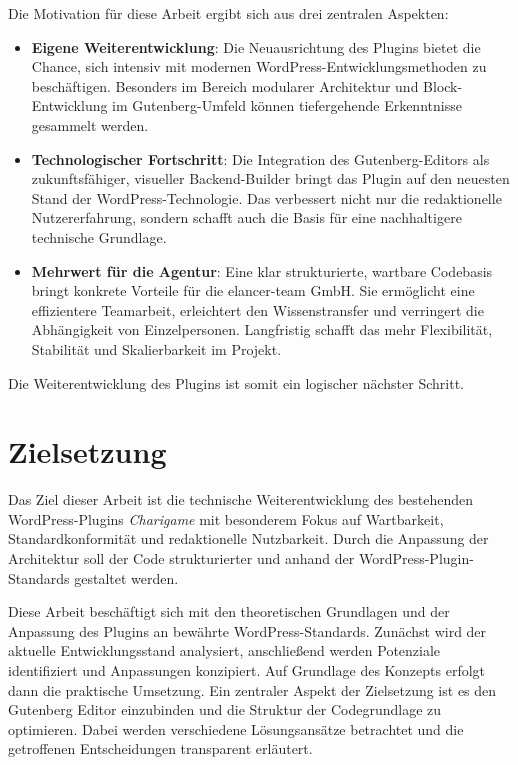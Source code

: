 Die Motivation für diese Arbeit ergibt sich aus drei zentralen Aspekten:
\begin{itemize}
    \item \textbf{Eigene Weiterentwicklung}: Die Neuausrichtung des Plugins bietet die Chance, sich intensiv mit modernen WordPress-Entwicklungsmethoden zu beschäftigen.
    Besonders im Bereich modularer Architektur und Block-Entwicklung im Gutenberg-Umfeld können tiefergehende Erkenntnisse gesammelt werden.

    \item \textbf{Technologischer Fortschritt}: Die Integration des Gutenberg-Editors als zukunftsfähiger, visueller Backend-Builder bringt das Plugin auf den neuesten Stand der WordPress-Technologie. Das verbessert nicht nur die redaktionelle Nutzererfahrung, sondern schafft auch die Basis für eine nachhaltigere technische Grundlage.

    \item \textbf{Mehrwert für die Agentur}: Eine klar strukturierte, wartbare Codebasis bringt konkrete Vorteile für die elancer-team GmbH. Sie ermöglicht eine effizientere Teamarbeit, erleichtert den Wissenstransfer und verringert die Abhängigkeit von Einzelpersonen. Langfristig schafft das mehr Flexibilität, Stabilität und Skalierbarkeit im Projekt.
\end{itemize}
Die Weiterentwicklung des Plugins ist somit ein logischer nächster Schritt.


\section{Zielsetzung}

Das Ziel dieser Arbeit ist die technische Weiterentwicklung des bestehenden WordPress-Plugins \textit{Charigame} mit besonderem Fokus auf Wartbarkeit, Standardkonformität und redaktionelle Nutzbarkeit.
Durch die Anpassung der Architektur soll der Code strukturierter und anhand der WordPress-Plugin-Standards gestaltet werden.

Diese Arbeit beschäftigt sich mit den theoretischen Grundlagen und der Anpassung des Plugins an bewährte WordPress-Standards.
Zunächst wird der aktuelle Entwicklungsstand analysiert, anschließend werden Potenziale identifiziert und Anpassungen konzipiert.
Auf Grundlage des Konzepts erfolgt dann die praktische Umsetzung.
Ein zentraler Aspekt der Zielsetzung ist es den Gutenberg Editor einzubinden und die Struktur der Codegrundlage zu optimieren.
Dabei werden verschiedene Lösungsansätze betrachtet und die getroffenen Entscheidungen transparent erläutert.

